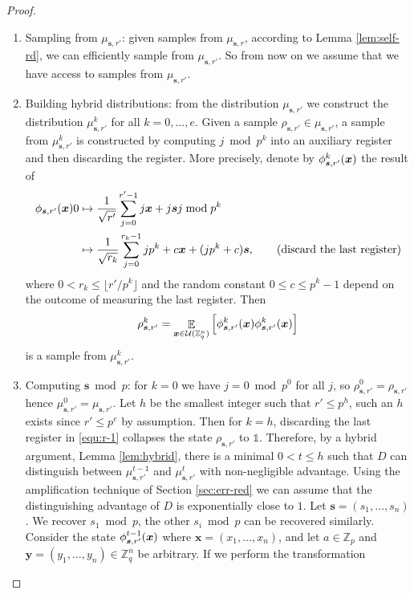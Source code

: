 \documentclass[11pt]{article}
\theoremstyle{plain}
\theoremstyle{definition}
\DeclareMathOperator{\E}{\mathbb{E}}
\let\ket\relax
\DeclarePairedDelimiter{\ket}{\lvert}{\rangle}
\let\bra\relax
\DeclarePairedDelimiter{\bra}{\langle}{\rvert}
\def\Z{\mathbb{Z}}
\def\U{\mathcal{U}}
\begin{document}
\begin{proof}
    \begin{enumerate}[leftmargin = *, font = \bfseries]
    \item Sampling from $\mu_{\bm{s}, r'}$: given samples from $\mu_{\bm{s}, r}$, according to Lemma \ref{lem:self-rd}, we can efficiently sample from $\mu_{\bm{s}, r'}$. So from now on we assume that we have access to samples from $\mu_{\bm{s}, r'}$.
    \item Building hybrid distributions: from the distribution $\mu_{\bm{s}, r'}$ we construct the distribution $\mu_{\bm{s}, r'}^k$ for all $k = 0, \dots, e$. Given a sample $\rho_{\bm{s}, r'} \in \mu_{\bm{s}, r'}$, a sample from $\mu_{\bm{s}, r'}^k$ is constructed by computing $j \bmod p^k$ into an auxiliary register and then discarding the register. More precisely, denote by $\ket{\phi_{\bm{s}, r'}^k(\bm{x})}$ the result of 
    \begin{align}
        \ket{\phi_{\bm{s}, r'}(\bm{x})}\ket{0}
        & \mapsto \frac{1}{\sqrt{r'}} \sum_{j = 0}^{r' - 1} \ket{j}\ket{\bm{x} + j\bm{s}}\ket{j \bmod p^k} \label{equ:r-1}  \\
        & \mapsto \frac{1}{\sqrt{r_k}} \sum_{j = 0}^{r_k - 1} \ket{jp^k + c}\ket{\bm{x} + (jp^k + c)\bm{s}}, \nonumber \tag{discard the last register}
    \end{align}
    where $0 < r_k \le \lfloor r' / p^k \rfloor$ and the random constant $0 \le c \le p^k - 1$ depend on the outcome of measuring the last register. Then
    \[ \rho_{\bm{s}, r'}^k = \E_{\bm{x} \in \U(\Z_q^n)} \Big[ \ket{\phi_{\bm{s}, r'}^k(\bm{x})} \bra{\phi_{\bm{s}, r'}^k(\bm{x})} \Big] \]
    is a sample from $\mu_{\bm{s}, r'}^k$.
    \item\label{step:s-mod-p} Computing $\bm{s} \bmod p$: for $k = 0$ we have $j = 0 \bmod p^0$ for all $j$, so $\rho_{\bm{s}, r'}^0 = \rho_{\bm{s}, r'}$ hence $\mu_{\bm{s}, r'}^0 = \mu_{\bm{s}, r'}$. Let $h$ be the smallest integer such that $r' \le p^h$, such an $h$ exists since $r' \le p^e$ by assumption. Then for $k = h$, discarding the last register in \eqref{equ:r-1} collapses the state $\rho_{\bm{s}, r'}$ to $\mathds{1}$. Therefore, by a hybrid argument, Lemma \ref{lem:hybrid}, there is a minimal $0 < t \le h$ such that $D$ can distinguish between $\mu_{\bm{s}, r'}^{t - 1}$ and $\mu_{\bm{s}, r'}^t$ with non-negligible advantage. Using the amplification technique of Section \ref{sec:err-red} we can assume that the distinguishing advantage of $D$ is exponentially close to $1$. Let $\bm{s} = (s_1, \dots, s_n)$. We recover $s_1 \bmod p$, the other $s_i \bmod p$ can be recovered similarly. Consider the state $\ket{\phi_{\bm{s}, r'}^{t - 1}(\bm{x})}$ where $\bm{x} = (x_1, \dots, x_n)$, and let $a \in \Z_p$ and $\bm{y} = (y_1, \dots, y_n) \in \Z_q^n$ be arbitrary. If we perform the transformation

\end{enumerate}
\end{proof}
\end{document}
